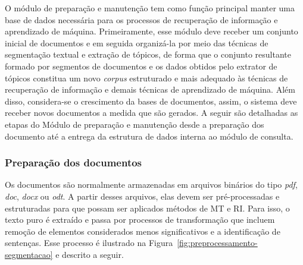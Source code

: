 O módulo de preparação e manutenção tem como função principal manter uma base de dados necessária para os processos de recuperação de informação e aprendizado de máquina. Primeiramente, esse módulo deve receber um conjunto inicial de documentos e em seguida organizá-la por meio das técnicas de segmentação textual e extração de tópicos, de forma que o conjunto resultante formado por segmentos de documentos e os dados obtidos pelo extrator de tópicos constitua um novo \textit{corpus} estruturado e mais adequado às técnicas de recuperação de informação e demais técnicas de aprendizado de máquina. Além disso, considera-se o crescimento da bases de documentos, assim, o sistema deve receber novos documentos a medida que são gerados. A seguir são detalhadas as etapas do Módulo de preparação e manutenção desde a preparação dos documento até a entrega da estrutura de dados interna ao módulo de consulta. 







\subsubsection{Preparação dos documentos}


Os documentos são normalmente armazenadas em arquivos binários do tipo \textit{pdf}, \textit{doc}, \textit{docx} ou \textit{odt}. A partir desses arquivos, elas devem ser pré-processadas e estruturadas para que possam ser aplicados métodos de MT e RI. Para isso, o texto puro é extraído e passa por processos de transformação que incluem remoção de elementos considerados menos significativos e a identificação de sentenças. Esse processo é ilustrado na Figura~\ref{fig:preprocessamento-segmentacao} e descrito a seguir.

